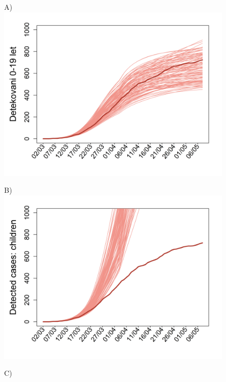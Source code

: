 \begin{figure}
	\begin{center}
		\begin{minipage}[t]{0.45\textwidth}
			A) \\
			\includegraphics[width = \textwidth]{pic/sc_bas_1.png}
		\end{minipage}
		\begin{minipage}[t]{0.45\textwidth}
			B) \\
			\includegraphics[width = \textwidth]{pic/sc_old90_30_1.png}
		\end{minipage}
		\begin{minipage}[m]{0.45\textwidth}
			C) \\

\end{minipage}
\end{center}
\end{figure}
